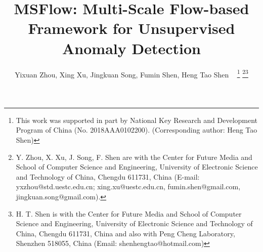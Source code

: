 \documentclass[lettersize,journal]{IEEEtran}
\begin{document}
\title{MSFlow: Multi-Scale Flow-based Framework for Unsupervised Anomaly Detection}




	\author{Yixuan Zhou, Xing Xu, Jingkuan Song, Fumin Shen, Heng Tao Shen ~
	\thanks{This work was supported in part by National Key Research and Development Program of China (No. 2018AAA0102200). (Corresponding author: Heng Tao Shen)}
	\thanks{Y. Zhou, X. Xu, J. Song, F. Shen are with the Center for Future Media and School of Computer Science and Engineering, University of Electronic Science and Technology of China, Chengdu 611731, China (E-mail: yxzhou@std.uestc.edu.cn; xing.xu@uestc.edu.cn, fumin.shen@gmail.com, jingkuan.song@gmail.com).}\thanks{H. T. Shen is with the Center for Future Media and School of Computer Science and Engineering, University of Electronic Science and Technology of China, Chengdu 611731, China and also with Peng Cheng Laboratory, Shenzhen 518055, China (Email: shenhengtao@hotmail.com)}}





\maketitle
\end{document}
